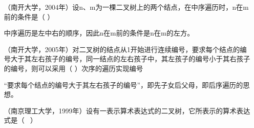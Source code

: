 \question （南开大学，2004年）设n、m为一棵二叉树上的两个结点，在中序遍历时，n在m前的条件是（
）
\par{}
\begin{solution}中序遍历是左中右的顺序，因此n在m前的条件是n在m的左方。
\end{solution}
\question （南开大学，2005年）对二叉树的结点从1开始进行连续编号，要求每个结点的编号大于其左右孩子的编号，同一结点的左右孩子中，其左孩子的编号小于其右孩子的编号，则可以采用（
）次序的遍历实现编号
\par{}
\begin{solution}``要求每个结点的编号大于其左右孩子的编号''，即先子女后父母，即后序遍历的思想。
\end{solution}
\question （南京理工大学，1999年）设有一表示算术表达式的二叉树，它所表示的算术表达式是（
~）

